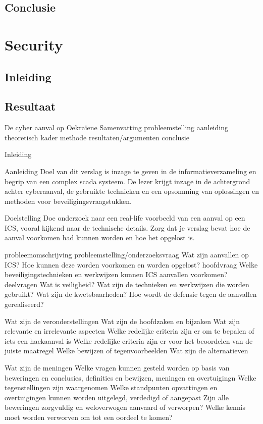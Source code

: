 \section{Conclusie}

 
\chapter{Security}

\section{Inleiding}

\section{Resultaat}


De cyber aanval op Oekraïene
Samenvatting
probleemstelling
aanleiding
theoretisch kader
methode
resultaten/argumenten
conclusie

Inleiding

Aanleiding
Doel van dit verslag is inzage te geven in de informatieverzameling en begrip van een complex scada
systeem. De lezer krijgt inzage in de achtergrond achter cyberaanval, de gebruikte technieken en
een opsomming van oplossingen en methoden voor beveiligingsvraagstukken.

Doelstelling
Doe onderzoek naar een real-life voorbeeld van een aanval op een ICS,
vooral kijkend naar de technische details.
Zorg dat je verslag bevat hoe de aanval voorkomen had kunnen worden en
hoe het opgelost is.

probleemomschrijving
probleemstelling/onderzoeksvraag Wat zijn aanvallen op ICS? Hoe kunnen deze worden voorkomen
en worden opgelost?
hoofdvraag
Welke beveiligingstechnieken en werkwijzen kunnen ICS aanvallen voorkomen?
deelvragen
Wat is veiligheid?
Wat zijn de technieken en werkwijzen die worden gebruikt?
Wat zijn de kwetsbaarheden?
Hoe wordt de defensie tegen de aanvallen gerealiseerd?

Wat zijn de veronderstellingen
Wat zijn de hoofdzaken en bijzaken
Wat zijn relevante en irrelevante aspecten
Welke redelijke criteria zijn er om te bepalen of iets een hackaanval is
Welke redelijke criteria zijn er voor het beoordelen van de juiste maatregel
Welke bewijzen of tegenvoorbeelden
Wat zijn de alternatieven

Wat zijn de meningen
Welke vragen kunnen gesteld worden op basis van beweringen en conclusies, definities en bewijzen,
meningen en overtuigingn
Welke tegenstellingen zijn waargenomen
Welke standpunten opvattingen en overtuigingen kunnen worden uitgelegd, verdedigd of aangepast
Zijn alle beweringen zorgvuldig en weloverwogen aanvaard of verworpen?
Welke kennis moet worden verworven om tot een oordeel te komen?



